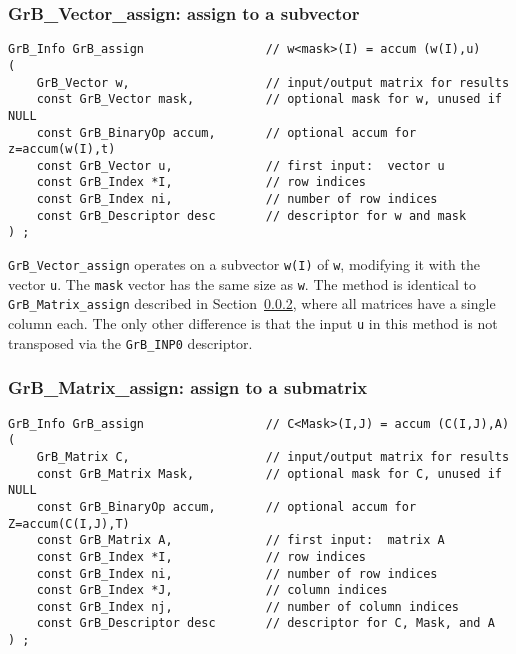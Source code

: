 \documentclass[12pt]{article}
\begin{document}
\subsubsection{{\sf GrB\_Vector\_assign:} assign to a subvector }
\label{assign_vector}

\begin{mdframed}[userdefinedwidth=6in]
{\footnotesize
\begin{verbatim}
GrB_Info GrB_assign                 // w<mask>(I) = accum (w(I),u)
(
    GrB_Vector w,                   // input/output matrix for results
    const GrB_Vector mask,          // optional mask for w, unused if NULL
    const GrB_BinaryOp accum,       // optional accum for z=accum(w(I),t)
    const GrB_Vector u,             // first input:  vector u
    const GrB_Index *I,             // row indices
    const GrB_Index ni,             // number of row indices
    const GrB_Descriptor desc       // descriptor for w and mask
) ;
\end{verbatim} } \end{mdframed}

\verb'GrB_Vector_assign' operates on a subvector \verb'w(I)' of \verb'w',
modifying it with the vector \verb'u'.  The \verb'mask' vector has the same
size as \verb'w'.  The method is identical to \verb'GrB_Matrix_assign'
described in Section~\ref{assign_matrix}, where all matrices have a single
column each.  The only other difference is that the input \verb'u' in this
method is not transposed via the \verb'GrB_INP0' descriptor.

\subsubsection{{\sf GrB\_Matrix\_assign:} assign to a submatrix }
\label{assign_matrix}

\begin{mdframed}[userdefinedwidth=6in]
{\footnotesize
\begin{verbatim}
GrB_Info GrB_assign                 // C<Mask>(I,J) = accum (C(I,J),A)
(
    GrB_Matrix C,                   // input/output matrix for results
    const GrB_Matrix Mask,          // optional mask for C, unused if NULL
    const GrB_BinaryOp accum,       // optional accum for Z=accum(C(I,J),T)
    const GrB_Matrix A,             // first input:  matrix A
    const GrB_Index *I,             // row indices
    const GrB_Index ni,             // number of row indices
    const GrB_Index *J,             // column indices
    const GrB_Index nj,             // number of column indices
    const GrB_Descriptor desc       // descriptor for C, Mask, and A
) ;
\end{verbatim} } \end{mdframed}
\end{document}
